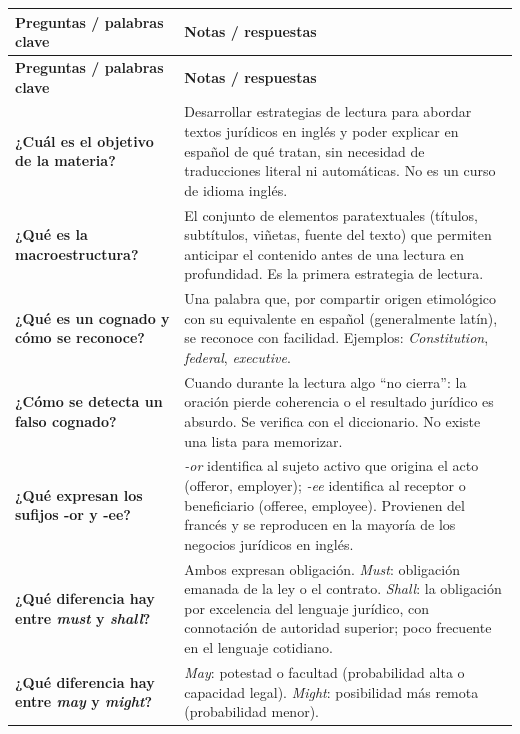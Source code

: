 \documentclass[12pt,oneside]{book}
\begin{document}
\begin{longtable}{
    >{\raggedright\arraybackslash}p{}
    >{\raggedright\arraybackslash}p{}
}
\toprule
\textbf{Preguntas / palabras clave} & \textbf{Notas / respuestas} \\
\midrule
\endfirsthead
\toprule
\textbf{Preguntas / palabras clave} & \textbf{Notas / respuestas} \\
\midrule
\endhead
\textbf{¿Cuál es el objetivo de la materia?} &
Desarrollar estrategias de lectura para abordar textos jurídicos en inglés y poder explicar en español de qué tratan, sin necesidad de traducciones literal ni automáticas. No es un curso de idioma inglés. \\

\textbf{¿Qué es la macroestructura?} &
El conjunto de elementos paratextuales (títulos, subtítulos, viñetas, fuente del texto) que permiten anticipar el contenido antes de una lectura en profundidad. Es la primera estrategia de lectura. \\

\textbf{¿Qué es un cognado y cómo se reconoce?} &
Una palabra que, por compartir origen etimológico con su equivalente en español (generalmente latín), se reconoce con facilidad. Ejemplos: \textit{Constitution}, \textit{federal}, \textit{executive}. \\

\textbf{¿Cómo se detecta un falso cognado?} &
Cuando durante la lectura algo ``no cierra'': la oración pierde coherencia o el resultado jurídico es absurdo. Se verifica con el diccionario. No existe una lista para memorizar. \\

\textbf{¿Qué expresan los sufijos -or y -ee?} &
\textit{-or} identifica al sujeto activo que origina el acto (offeror, employer); \textit{-ee} identifica al receptor o beneficiario (offeree, employee). Provienen del francés y se reproducen en la mayoría de los negocios jurídicos en inglés. \\

\textbf{¿Qué diferencia hay entre \textit{must} y \textit{shall}?} &
Ambos expresan obligación. \textit{Must}: obligación emanada de la ley o el contrato. \textit{Shall}: la obligación por excelencia del lenguaje jurídico, con connotación de autoridad superior; poco frecuente en el lenguaje cotidiano. \\

\textbf{¿Qué diferencia hay entre \textit{may} y \textit{might}?} &
\textit{May}: potestad o facultad (probabilidad alta o capacidad legal). \textit{Might}: posibilidad más remota (probabilidad menor). \\


\end{longtable}
\end{document}

